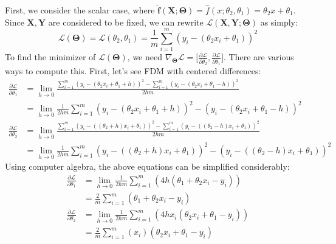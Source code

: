 \documentclass[12pt,initial,twoside,maitrise]{dms}
\numberwithin{equation}{section}
\numberwithin{table}{chapter}
\numberwithin{figure}{chapter}
\begin{document}
First, we consider the scalar case, where $\mathbf{\hat f}(\mathbf{X}; \bm\Theta) = \hat f(x; \theta_2, \theta_1) = \theta_2 x + \theta_1$. Since $\mathbf{X}, \mathbf{Y}$ are considered to be fixed, we can rewrite $\mathcal{L}(\mathbf{X}, \mathbf{Y}; \bm\Theta)$ as simply:
%
\begin{equation}
\mathcal{L}(\bm\Theta) = \mathcal{L}(\theta_2, \theta_1) = \frac{1}{m}\sum_{i=1}^m(y_i - (\theta_2 x_i + \theta_1))^2
\end{equation}
%
To find the minimizer of $\mathcal{L}(\bm\Theta)$, we need $\nabla_{\bm\Theta}\mathcal{L} = \lbrack \frac{\partial\mathcal{L}}{\partial \theta_2}, \frac{\partial\mathcal{L}}{\partial \theta_1}\rbrack$. There are various ways to compute this. First, let's see FDM with centered differences:
%
\begin{align}
\frac{\partial\mathcal{L}}{\partial \theta_1} & = \underset{h \rightarrow 0}{\operatorname{lim}} \frac{\sum_{i=1}^m\left(y_i - \left(\theta_2 x_i + \theta_1 + h\right)\right)^2 - \sum_{i=1}^m\left(y_i - \left(\theta_2 x_i + \theta_1 - h\right)\right)^2}{2hm} \\ & = \underset{h \rightarrow 0}{\operatorname{lim}} \frac{1}{2hm}\sum_{i=1}^m\left(y_i - \left(\theta_2 x_i + \theta_1 + h\right)\right)^2 - \left(y_i - \left(\theta_2 x_i + \theta_1 - h\right)\right)^2 \\
\frac{\partial\mathcal{L}}{\partial \theta_2} & = \underset{h \rightarrow 0}{\operatorname{lim}} \frac{\sum_{i=1}^m\left(y_i - \left((\theta_2 + h) x_i + \theta_1\right)\right)^2 - \sum_{i=1}^m\left(y_i - \left(\left(\theta_2 - h\right) x_i + \theta_1\right)\right)^2}{2hm} \\ & = \underset{h \rightarrow 0}{\operatorname{lim}} \frac{1}{2hm}\sum_{i=1}^m\left(y_i - \left(\left(\theta_2 + h\right) x_i + \theta_1\right)\right)^2 - \left(y_i - \left(\left(\theta_2 - h\right) x_i + \theta_1\right)\right)^2
\end{align}
%
Using computer algebra, the above equations can be simplified considerably:
%
\begin{align}
\frac{\partial\mathcal{L}}{\partial \theta_1} & = \underset{h \rightarrow 0}{\operatorname{lim}} \frac{1}{2hm}\sum_{i=1}^m\left(4h ( \theta_1 +  \theta_2 x_i - y_i)\right) \label{eq:dL_dtheta0} \\
& = \boxed{\frac{2}{m}\sum_{i=1}^m\left(\theta_1 + \theta_2 x_i - y_i\right)} \\
\frac{\partial\mathcal{L}}{\partial \theta_2} & = \underset{h \rightarrow 0}{\operatorname{lim}} \frac{1}{2hm}\sum_{i=1}^m\left(4hx_i (\theta_2 x_i + \theta_1 - y_i)\right) \label{eq:dL_dtheta1} \\
& = \boxed{\frac{2}{m}\sum_{i=1}^m(x_i)(\theta_2 x_i + \theta_1 - y_i)}
\end{align}
\end{document}
